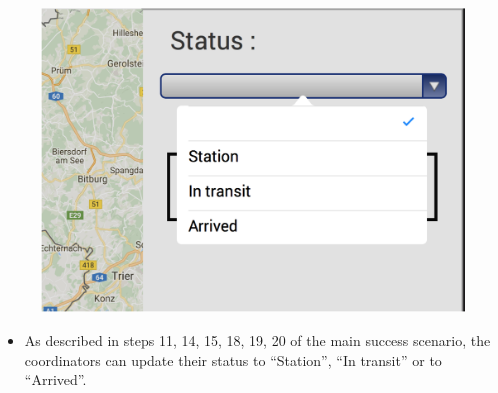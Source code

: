 \begin{minipage}{0.72\textwidth}
\begin{figure}[H]
\includegraphics[width=1.0\textwidth]{Ipad_status.eps}
\end{figure}
\end{minipage} \hfill
\begin{minipage}{0.23\textwidth}
\begin{itemize}
\item As described in steps 11, 14, 15, 18, 19, 20 of the main success scenario,
the coordinators can update their status to ``Station'', ``In
transit'' or to ``Arrived''.
\end{itemize}
\end{minipage}



